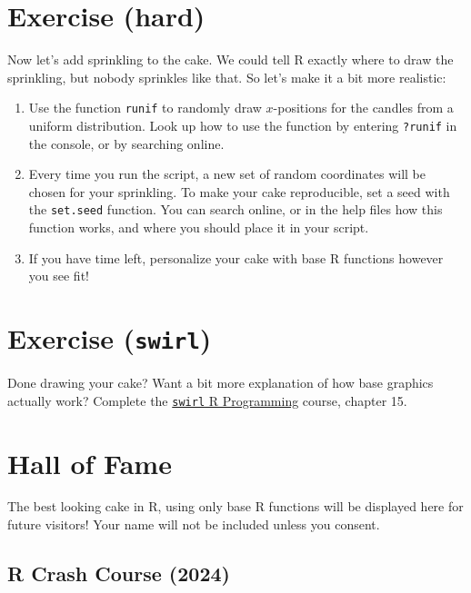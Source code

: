 \documentclass[
]{book}
\providecommand{\tightlist}{%
  \setlength{\itemsep}{0pt}\setlength{\parskip}{0pt}}
\begin{document}
\hypertarget{exercise-hard}{%
\section{Exercise (hard)}\label{exercise-hard}}

Now let's add sprinkling to the cake. We could tell R exactly where to draw the sprinkling, but nobody sprinkles like that. So let's make it a bit more realistic:

\begin{enumerate}
\def\labelenumi{\arabic{enumi}.}
\tightlist
\item
  Use the function \texttt{runif} to randomly draw \(x\)-positions for the candles from a uniform distribution. Look up how to use the function by entering \texttt{?runif} in the console, or by searching online.
\item
  Every time you run the script, a new set of random coordinates will be chosen for your sprinkling. To make your cake reproducible, set a seed with the \texttt{set.seed} function. You can search online, or in the help files how this function works, and where you should place it in your script.
\item
  If you have time left, personalize your cake with base R functions however you see fit!
\end{enumerate}

\hypertarget{exercise-swirl}{%
\section{\texorpdfstring{Exercise (\texttt{swirl})}{Exercise (swirl)}}\label{exercise-swirl}}

Done drawing your cake? Want a bit more explanation of how base graphics actually work? Complete the \href{https://youtu.be/eKKil5iyxLM?t=148}{\texttt{swirl} R Programming} course, chapter 15.

\hypertarget{hall-of-fame}{%
\section*{Hall of Fame}\label{hall-of-fame}}

The best looking cake in R, using only base R functions will be displayed here for future visitors! Your name will not be included unless you consent.

\hypertarget{r-crash-course-2024}{%
\subsection*{R Crash Course (2024)}\label{r-crash-course-2024}}
\end{document}

